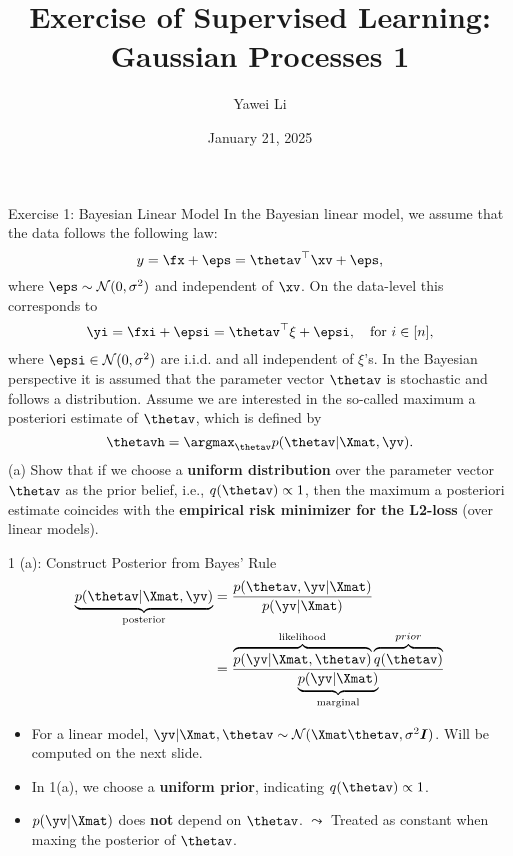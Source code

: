 \documentclass[aspectratio=169]{beamer}
\title[]{\textbf{Exercise of Supervised Learning:\\Gaussian Processes 1}}
\author{Yawei Li}
\institute[LMU]
{
\\
  \texttt{yawei.li@stat.uni-muenchen.de}
}
\date{January 21, 2025}
\newcommand{\Norm}{\mathcal{N}}
\newcommand{\Imat}{\bm{I}}
\begin{document}
\begin{frame}
\titlepage

\end{frame}

\begin{frame}{Exercise 1: Bayesian Linear Model}
\small
In the Bayesian linear model, we assume that the data follows the following law:
\begin{equation*}
	y = \fx + \eps = \thetav^\top \xv + \eps,
\end{equation*}
where $\eps \sim \Norm(0, \sigma^2)$ and independent of $\xv$. On the data-level this corresponds to 
\begin{equation*}
	\yi = \fxi + \epsi = \thetav^\top \xi + \epsi, \quad \text{for } i \in [n],
\end{equation*}
where $\epsi \in \Norm(0, \sigma^2)$ are i.i.d. and all independent of $\xi$'s. In the Bayesian perspective it is assumed that the parameter vector $\thetav$ is stochastic and follows a distribution.
%
Assume we are interested in the so-called maximum a posteriori estimate of $\thetav$, which is defined by $$\thetavh = \argmax_{\thetav} p(\thetav | \Xmat, \yv).$$
%
(a) Show that if we choose a \textbf{uniform distribution} over the parameter vector $\thetav$ as the prior belief, i.e., $q(\thetav) \propto 1$, then the maximum a posteriori estimate coincides with the \textbf{empirical risk minimizer for the L2-loss} (over linear models). 	
\end{frame}

\begin{frame}{1 (a): Construct Posterior from Bayes' Rule}
	\begin{equation*}
		\begin{aligned}
			\underbrace{p(\thetav | \Xmat, \yv)}_{\text{posterior}} &= \frac{p(\thetav, \yv| \Xmat)}{p(\yv | \Xmat)} \\
			&= \frac{\overbrace{p(\yv | \Xmat, \thetav)}^{\text{likelihood}} \overbrace{q(\thetav)}^{prior} }{\underbrace{p(\yv | \Xmat)}_{\text{marginal}}}
		\end{aligned}
	\end{equation*}
	
	\begin{itemize}
			\item For a linear model, $\yv | \Xmat, \thetav \sim \Norm(\Xmat \thetav, \sigma^2 \Imat)$. Will be computed on the next slide.
			\item In 1(a), we choose a \textbf{uniform prior}, indicating $q(\thetav) \propto 1$.
			\item $p(\yv | \Xmat)$ does \textbf{not} depend on $\thetav$. $\leadsto$ Treated as  constant when maxing the posterior of $\thetav$.
	\end{itemize}
\end{frame}
\end{document}
